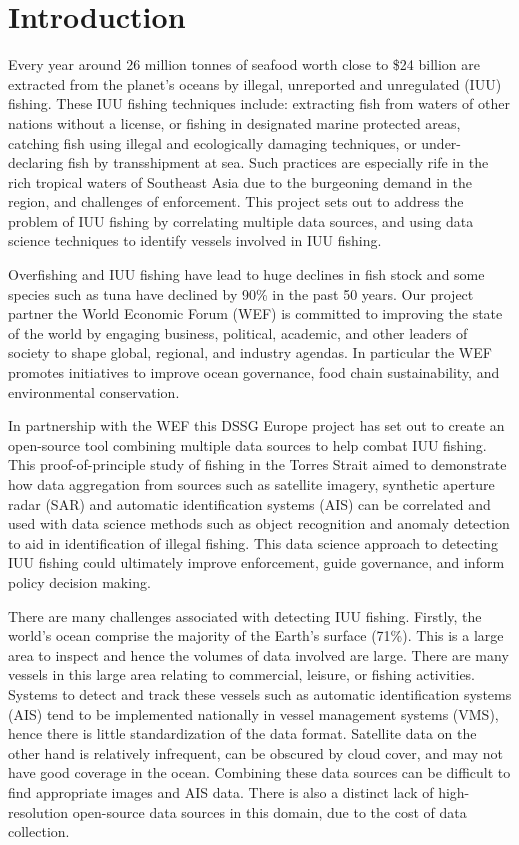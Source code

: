 \section{Introduction}
Every year around 26 million tonnes of seafood worth close to \$24 billion are extracted from the planet's oceans by illegal, unreported and unregulated (IUU) fishing. These IUU fishing techniques include: extracting fish from waters of other nations without a license, or fishing in designated marine protected areas, catching fish using illegal and ecologically damaging techniques, or under-declaring fish by transshipment at sea. Such practices are especially rife in the rich tropical waters of Southeast Asia due to the burgeoning demand in the region, and challenges of enforcement. This project sets out to address the problem of IUU fishing by correlating multiple data sources, and using data science techniques to identify vessels involved in IUU fishing.

Overfishing and IUU fishing have lead to huge declines in fish stock and some species such as tuna have declined by 90\% in the past 50 years. Our project partner the World Economic Forum (WEF) is committed to improving the state of the world by engaging business, political, academic, and other leaders of society to shape global, regional, and industry agendas. In particular the WEF promotes initiatives to improve ocean governance, food chain sustainability, and environmental conservation.

In partnership with the WEF this DSSG Europe project has set out to create an open-source tool combining multiple data sources to help combat IUU fishing. This proof-of-principle study of fishing in the Torres Strait aimed to demonstrate how data aggregation from sources such as satellite imagery, synthetic aperture radar (SAR) and automatic identification systems (AIS) can be correlated and used with data science methods such as object recognition and anomaly detection to aid in identification of illegal fishing. This data science approach to detecting IUU fishing could ultimately improve enforcement, guide governance, and inform policy decision making.

There are many challenges associated with detecting IUU fishing. Firstly, the world's ocean comprise the majority of the Earth's surface (71\%). This is a large area to inspect and hence the volumes of data involved are large. There are many vessels in this large area relating to commercial, leisure, or fishing activities. Systems to detect and track these vessels such as automatic identification systems (AIS) tend to be implemented nationally in vessel management systems (VMS), hence there is little standardization of the data format. Satellite data on the other hand is relatively infrequent, can be obscured by cloud cover, and may not have good coverage in the ocean. Combining these data sources can be difficult to find appropriate images and AIS data. There is also a distinct lack of high-resolution open-source data sources in this domain, due to the cost of data collection.

